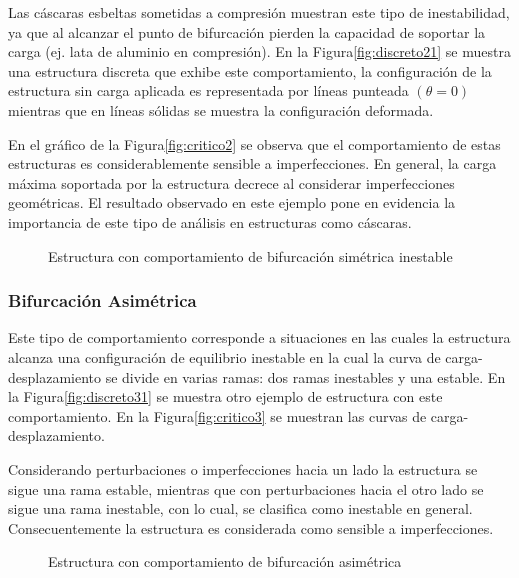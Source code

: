 Las cáscaras esbeltas sometidas a compresión muestran este tipo de inestabilidad, ya que al alcanzar el punto de bifurcación pierden la capacidad de soportar la carga (ej. lata de aluminio en compresión). En la Figura\autoref{fig:discreto21} se muestra una estructura discreta que exhibe este comportamiento, la configuración de la estructura sin carga aplicada es representada por líneas punteada $(\theta = 0)$ mientras que en líneas sólidas se muestra la configuración deformada.

En el gráfico de la Figura\autoref{fig:critico2} se observa que el comportamiento de estas estructuras es considerablemente sensible a imperfecciones. En general, la carga máxima soportada por la estructura decrece al considerar imperfecciones geométricas. El resultado observado en este ejemplo pone en evidencia la importancia de este tipo de análisis en estructuras como cáscaras.
\begin{figure}[htb]
	\centering
{}
\hspace{1em}
\caption{Estructura con comportamiento de bifurcación simétrica inestable}
	\label{fig:simetrica2}
\end{figure}

\subsubsection{Bifurcación Asimétrica}

Este tipo de comportamiento corresponde a situaciones en las cuales la estructura alcanza una configuración de equilibrio inestable en la cual la curva de carga-desplazamiento se divide en varias ramas: dos ramas inestables y una estable. En la
Figura\autoref{fig:discreto31} se muestra otro ejemplo de estructura con este comportamiento. En la Figura\autoref{fig:critico3} se muestran las curvas de carga-desplazamiento.

Considerando perturbaciones o imperfecciones hacia un lado la estructura se sigue una rama estable, mientras que con perturbaciones hacia el otro lado se sigue una rama inestable, con lo cual, se clasifica como inestable en general. Consecuentemente la estructura es considerada como sensible a imperfecciones.
\begin{figure}[htb]
	\centering
{}
\hspace{1em}
\caption{Estructura con comportamiento de bifurcación asimétrica}
	\label{fig:asimetrica}
\end{figure}


